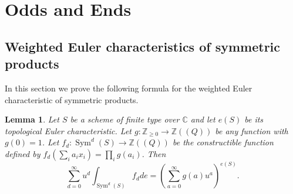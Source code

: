 \documentclass{amsart}
\newtheorem{lemma}[theorem]{Lemma}
\theoremstyle{definition}
\newcommand{\CC} {\mathbb{C}}          %
\newcommand{\ZZ} {\mathbb{Z}}		%
\newcommand{\Sym}{\operatorname{Sym}}
\begin{document}


   

\appendix
\section{Odds and Ends}\label{appendix: odds and ends}


\subsection{Weighted Euler characteristics of symmetric products}

In this section we prove the following formula for the weighted Euler
characteristic of symmetric products.

\begin{lemma}\label{lem: formula for euler char of sym products}
Let $S$ be a scheme of finite type over $\CC $ and let $e (S)$ be its
topological Euler characteristic. Let $g:\ZZ _{\geq 0}\to \ZZ ((Q))$
be any function with $g (0)=1$. Let $f_{d}:\Sym ^{d} (S)\to \ZZ ((Q))$
be the constructible function defined by $f_{d} (\sum_{i}
a_{i}x_{i})=\prod _{i}g (a_{i})$. Then
\[
\sum _{d=0}^{\infty } u^{d} \int _{\Sym ^{d} (S)} f_{d} de =
\left(\sum _{a=0}^{\infty }g (a) u^{a} \right)^{e (S)}.
\]
\end{lemma}
\end{document}
